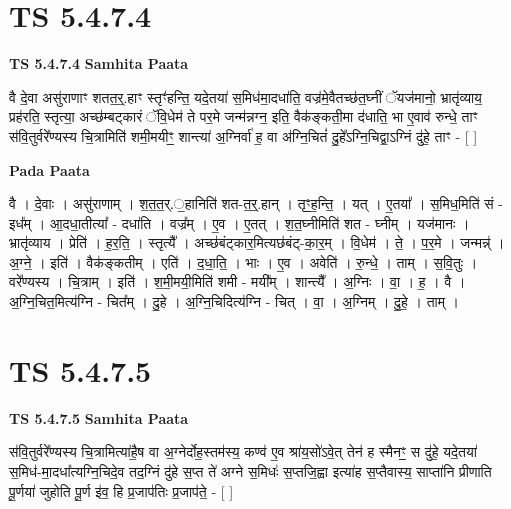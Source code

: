 \documentclass[17pt]{extarticle}
\begin{document}
\section*{ TS 5.4.7.4 }

\textbf{TS 5.4.7.4 } \newline
\textbf{Samhita Paata} \newline

वै दे॒वा असु॑राणाꣳ शतत॒र्॒.हाꣳ स्तृꣳ॑हन्ति॒ यदे॒तया॑ स॒मिध॑मा॒दधा॑ति॒ वज्र॑मे॒वैतच्छ॑त॒घ्नीं ॅयज॑मानो॒ भ्रातृ॑व्याय॒ प्रह॑रति॒ स्तृत्या॒ अच्छ॑म्बट्कारं ॅवि॒धेम॑ ते पर॒मे जन्म॑न्नग्न॒ इति॒ वैक॑ङ्कती॒मा द॑धाति॒ भा ए॒वाव॑ रुन्धे॒ ताꣳ स॑वि॒तुर्वरे᳚ण्यस्य चि॒त्रामिति॑ शमी॒मयीꣳ॒॒ शान्त्या॑ अ॒ग्निर्वा॑ ह॒ वा अ॑ग्नि॒चितं॑ दु॒हे᳚ऽग्नि॒चिद्वा॒ऽग्निं दु॑हे॒ ताꣳ - [  ] \newline

\textbf{Pada Paata} \newline

वै । दे॒वाः । असु॑राणाम् । श॒त॒त॒र्.॒हानिति॑ शत-त॒र्॒.हान् । तृꣳ॒॒ह॒न्ति॒ । यत् । ए॒तया᳚ । स॒मिध॒मिति॑ सं - इध᳚म् । आ॒दधा॒तीत्या᳚ - दधा॑ति । वज्र᳚म् । ए॒व । ए॒तत् । श॒त॒घ्नीमिति॑ शत - घ्नीम् । यज॑मानः । भ्रातृ॑व्याय । प्रेति॑ । ह॒र॒ति॒ । स्तृत्यै᳚ । अच्छ॑बंट्कार॒मित्यछ॑बंट्-का॒र॒म् । वि॒धेम॑ । ते॒ । प॒र॒मे । जन्मन्न्॑ । अ॒ग्ने॒ । इति॑ । वैक॑ङ्कतीम् । एति॑ । द॒धा॒ति॒ । भाः । ए॒व । अवेति॑ । रु॒न्धे॒ । ताम् । स॒वि॒तुः । वरे᳚ण्यस्य । चि॒त्राम् । इति॑ । श॒मी॒मयी॒मिति॑ शमी - मयी᳚म् । शान्त्यै᳚ । अ॒ग्निः । वा॒ । ह॒ । वै । अ॒ग्नि॒चित॒मित्य॑ग्नि - चित᳚म् । दु॒हे । अ॒ग्नि॒चिदित्य॑ग्नि - चित् । वा॒ । अ॒ग्निम् । दु॒हे॒ । ताम् ।  \newline




\section*{ TS 5.4.7.5 }

\textbf{TS 5.4.7.5 } \newline
\textbf{Samhita Paata} \newline

स॑वि॒तुर्वरे᳚ण्यस्य चि॒त्रामित्या॑है॒ष वा अ॒ग्नेर्दोह॒स्तम॑स्य॒ कण्व॑ ए॒व श्रा॑य॒सो॑ऽवे॒त् तेन॑ ह स्मैनꣳ॒॒ स दु॑हे॒ यदे॒तया॑ स॒मिध॑-मा॒दधा᳚त्यग्नि॒चिदे॒व तद॒ग्निं दु॑हे स॒प्त ते॑ अग्ने स॒मिधः॑ स॒प्तजि॒ह्वा इत्या॑ह स॒प्तैवास्य॒ साप्ता॑नि प्रीणाति पू॒र्णया॑ जुहोति पू॒र्ण इ॑व॒ हि प्र॒जाप॑तिः प्र॒जाप॑ते॒ - [  ] \newline
\end{document}
